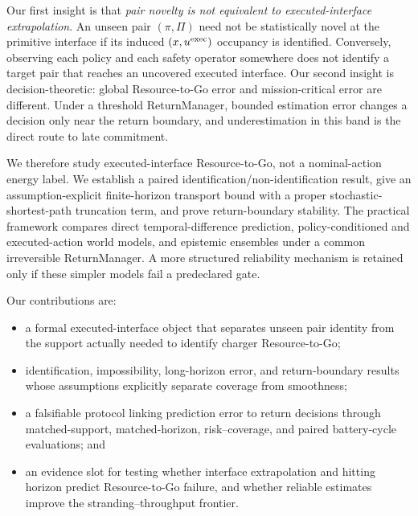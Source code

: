 Our first insight is that \emph{pair novelty is not equivalent to executed-interface extrapolation}. An unseen pair \((\pi,\Pi)\) need not be statistically novel at the primitive interface if its induced \((x,u^{\rm exec})\) occupancy is identified. Conversely, observing each policy and each safety operator somewhere does not identify a target pair that reaches an uncovered executed interface. Our second insight is decision-theoretic: global Resource-to-Go error and mission-critical error are different. Under a threshold ReturnManager, bounded estimation error changes a decision only near the return boundary, and underestimation in this band is the direct route to late commitment.

We therefore study executed-interface Resource-to-Go, not a nominal-action energy label. We establish a paired identification/non-identification result, give an assumption-explicit finite-horizon transport bound with a proper stochastic-shortest-path truncation term, and prove return-boundary stability. The practical framework compares direct temporal-difference prediction, policy-conditioned and executed-action world models, and epistemic ensembles under a common irreversible ReturnManager. A more structured reliability mechanism is retained only if these simpler models fail a predeclared gate.

Our contributions are:
\begin{itemize}[leftmargin=*,topsep=2pt,itemsep=1pt]
  \item a formal executed-interface object that separates unseen pair identity from the support actually needed to identify charger Resource-to-Go;
  \item identification, impossibility, long-horizon error, and return-boundary results whose assumptions explicitly separate coverage from smoothness;
  \item a falsifiable protocol linking prediction error to return decisions through matched-support, matched-horizon, risk--coverage, and paired battery-cycle evaluations; and
  \item {} an evidence slot for testing whether interface extrapolation and hitting horizon predict Resource-to-Go failure, and whether reliable estimates improve the stranding--throughput frontier.
\end{itemize}
